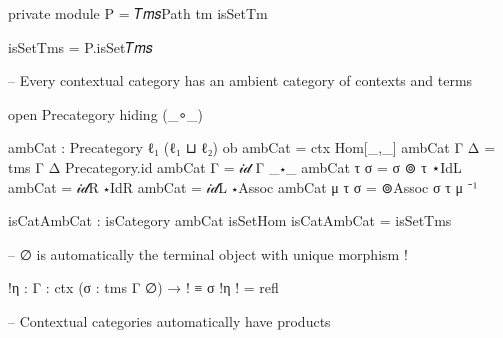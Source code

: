 \begin{code}[hide]
  private
    module P = 𝑇𝑚𝑠Path tm isSetTm

  isSetTms = P.isSet𝑇𝑚𝑠

  -- Every contextual category has an ambient category of contexts and terms

  open Precategory hiding (_∘_)

  ambCat : Precategory ℓ₁ (ℓ₁ ⊔ ℓ₂)
  ob ambCat = ctx
  Hom[_,_] ambCat Γ Δ = tms Γ Δ
  Precategory.id ambCat Γ = 𝒾𝒹 Γ
  _⋆_ ambCat τ σ = σ ⊚ τ
  ⋆IdL ambCat = 𝒾𝒹R
  ⋆IdR ambCat = 𝒾𝒹L
  ⋆Assoc ambCat μ τ σ = ⊚Assoc σ τ μ ⁻¹

  isCatAmbCat : isCategory ambCat
  isSetHom isCatAmbCat = isSetTms

  -- ∅ is automatically the terminal object with unique morphism !

  !η : {Γ : ctx} (σ : tms Γ ∅) → ! ≡ σ
  !η ! = refl

  -- Contextual categories automatically have products
\end{code}

